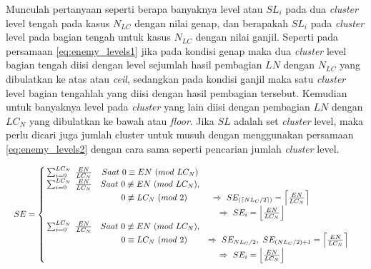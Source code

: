 Munculah pertanyaan seperti berapa banyaknya level atau $SL_{i}$ pada dua \textit{cluster} level tengah pada kasus $N_{LC}$ dengan nilai genap, dan berapakah $SL_{i}$ pada \textit{cluster} level pada bagian tengah untuk kasus $N_{LC}$ dengan nilai ganjil. Seperti pada persamaan \ref{eq:enemy_levels1} jika pada kondisi genap maka dua \textit{cluster} level bagian tengah diisi dengan level sejumlah hasil pembagian $LN$ dengan $N_{LC}$ yang dibulatkan ke atas atau \textit{ceil}, sedangkan pada kondisi ganjil maka satu \textit{cluster} level bagian tengahlah yang diisi dengan hasil pembagian tersebut. Kemudian untuk banyaknya level pada \textit{cluster} yang lain diisi dengan pembagian $LN$ dengan $LC_{N}$ yang dibulatkan ke bawah atau \textit{floor}. Jika $SL$ adalah set \textit{cluster} level, maka perlu dicari juga jumlah cluster untuk musuh dengan menggunakan persamaan \ref{eq:enemy_levels2} dengan cara sama seperti pencarian jumlah \textit{cluster} level. 
\vspace{1ex}

\begin{equation}\label{eq:enemy_levels2}
\resizebox{\columnwidth}{!}{%
	$SE = \left\{\begin{matrix}
	\hspace{0.2em} \sum_{i = 0}^{LC_{N}}\ \frac{EN}{LC_{N}} & Saat\ 0 \equiv EN\ (mod\ LC_{N}) & \\
	
	\hspace{0.2em} \sum_{i = 0}^{LC_{N}}\ \frac{EN}{LC_{N}} & Saat\ 0 \not\equiv EN\ (mod\ LC_{N}), & \\
	&\hspace{1.0em}  0 \not\equiv LC_{N}\ (mod\ 2) & \hspace{-4.0em} \Rightarrow\ SE_{(\left \lceil NL_{C}/2 \right \rceil)}  = \left \lceil \frac{EN}{LC_{N}} \right \rceil &\\
	
	& & \hspace{-6.2em} \Rightarrow\ SE_{i}  = \left \lfloor \frac{EN}{LC_{N}} \right \rfloor &\\
	
	\hspace{0.2em} \sum_{i = 0}^{LC_{N}}\ \frac{EN}{LC_{N}} & Saat\ 0 \not\equiv EN\ (mod\ LC_{N}), & \\
	&\hspace{1.0em}  0 \equiv LC_{N}\ (mod\ 2) & \Rightarrow\ SE_{NL_{C}/2},\ SE_{(NL_{C}/2) + 1}  = \left \lceil \frac{EN}{LC_{N}} \right \rceil &\\
	
	& & \hspace{-6.2em} \Rightarrow\ SE_{i}  = \left \lfloor \frac{EN}{LC_{N}} \right \rfloor &\\
	\end{matrix}\right.$%
}
\end{equation}

